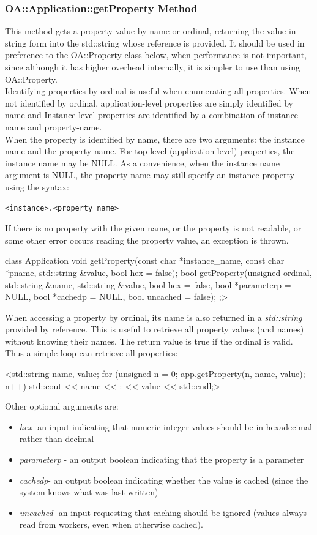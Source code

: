\documentclass[10pt, a4paper, oneside]{article}
\renewcommand\_{\textunderscore\allowbreak} %
\begin{document}
\subsubsection{OA::Application::getProperty Method} This method gets a property value by name or ordinal, returning the value in string form into the std::string whose reference is provided.  It should be used in preference to the OA::Property class below, when performance is not important, since although it has higher overhead internally, it is simpler to use than using OA::Property.\\
Identifying properties by ordinal is useful when enumerating all properties.  When not identified by ordinal, application-level properties are simply identified by name and Instance-level properties are identified by a combination of instance-name and property-name. \\
When the property is identified by name, there are two arguments:  the instance name and the property name.  For top level (application-level) properties, the instance name may be NULL.  As a convenience, when the instance name argument is NULL, the property name may still specify an instance property using the syntax: \begin{verbatim}<instance>.<property_name>\end{verbatim}If there is no property with the given name, or the property is not readable, or some other error occurs reading the property value, an exception is thrown.
\begin{ocpixml}
class Application {
	void getProperty(const char *instance_name, const char *pname,
	std::string &value, bool hex = false);
	bool getProperty(unsigned ordinal, std::string &name,
	std::string &value, bool hex = false,
	bool *parameterp = NULL, bool *cachedp = NULL,
	bool uncached = false);
};> \end{ocpixml}When accessing a property by ordinal, its name is also returned in a \emph{std::string} provided by reference.  This is useful to retrieve all property values (and names) without knowing their names. The return value is true if the ordinal is valid. Thus a simple loop can retrieve all properties:\begin{ocpixml}
<std::string name, value;
for (unsigned n = 0; app.getProperty(n, name, value); n++)
std::cout << name << : << value << std::endl;>\end{ocpixml}Other optional arguments are:
\begin{itemize}
\item \emph{hex}- an input indicating that numeric integer values should be in hexadecimal rather than decimal 
\item \emph{parameterp} -  an output boolean indicating that the property is a parameter
\item \emph{cachedp}-  an output boolean indicating whether the value is cached (since the system knows what was last written)
\item \emph{uncached}- an input requesting that caching should be ignored (values always read from workers, even when otherwise cached).
\end{itemize}
\end{document}
